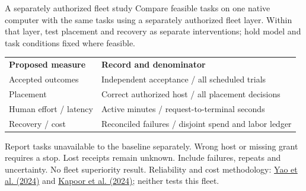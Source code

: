 \begin{frame}[label=fleet-comparison]{A separately authorized fleet study}
Compare feasible tasks on one native computer with the same tasks using a
separately authorized fleet layer. Within that layer, test placement and recovery
as separate interventions; hold model and task conditions fixed where feasible.
\medskip
{\small\begin{tabular}{p{.28\linewidth}p{.63\linewidth}}
\textbf{Proposed measure} & \textbf{Record and denominator} \\
Accepted outcomes & Independent acceptance / all scheduled trials \\
Placement & Correct authorized host / all placement decisions \\
Human effort / latency & Active minutes / request-to-terminal seconds \\
Recovery / cost & Reconciled failures / disjoint spend and labor ledger \\
\end{tabular}}
\par\medskip
Report tasks unavailable to the baseline separately. Wrong host or missing grant
requires a stop. Lost receipts remain unknown. Include failures, repeats and uncertainty.
\vfill
{\footnotesize No fleet superiority result. Reliability and cost methodology:
\href{https://arxiv.org/abs/2406.12045}{Yao et al. (2024)} and
\href{https://arxiv.org/abs/2407.01502}{Kapoor et al. (2024)}; neither tests this fleet.}
\end{frame}
